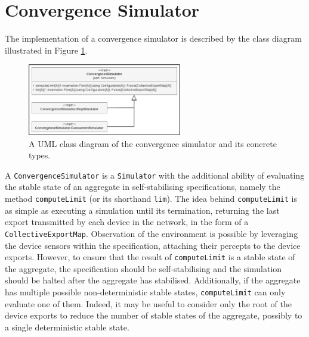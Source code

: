 
\section{Convergence Simulator}
\label{section:implementation:convergence-simulator}

The implementation of a convergence simulator is described by the class diagram
illustrated in Figure \ref{figure:convergence-simulator-class-diagram}.

\begin{figure}[!ht]
  \centering
  \includegraphics[width=0.60\textwidth]{resources/figures/convergence-simulator-class-diagram.png}
  \caption{A UML class diagram of the convergence simulator and its concrete types.}
  \label{figure:convergence-simulator-class-diagram}
\end{figure}

A \texttt{ConvergenceSimulator} is a \texttt{Simulator} with the additional
ability of evaluating the stable state of an aggregate in self-stabilising
specifications, namely the method \texttt{computeLimit} (or its shorthand
\texttt{lim}). The idea behind \texttt{computeLimit} is as simple as executing
a simulation until its termination, returning the last export transmitted by
each device in the network, in the form of a \texttt{CollectiveExportMap}.
Observation of the environment is possible by leveraging the device sensors
within the specification, attaching their percepts to the device exports.
However, to ensure that the result of \texttt{computeLimit} is a stable state
of the aggregate, the specification should be self-stabilising and the
simulation should be halted after the aggregate has stabilised. Additionally,
if the aggregate has multiple possible non-deterministic stable states,
\texttt{computeLimit} can only evaluate one of them. Indeed, it may be useful
to consider only the root of the device exports to reduce the number of stable
states of the aggregate, possibly to a single deterministic stable state.

